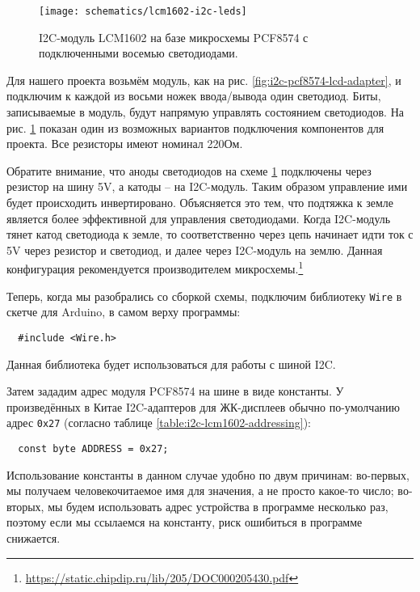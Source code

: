 \documentclass[../sparc.tex]{subfiles}
\begin{document}
\begin{figure}[H]
  \centering
  \texttt{[image: schematics/lcm1602-i2c-leds]}
  \caption{I2C-модуль LCM1602 на базе микросхемы PCF8574 с подключенными восемью
    светодиодами.}
  \label{fig:lcm1602-i2c-leds}
\end{figure}

Для нашего проекта возьмём модуль, как на рис.
\ref{fig:i2c-pcf8574-lcd-adapter}, и подключим к каждой из восьми ножек
ввода/вывода один светодиод.  Биты, записываемые в модуль, будут напрямую
управлять состоянием светодиодов.  На рис. \ref{fig:lcm1602-i2c-leds} показан
один из возможных вариантов подключения компонентов для проекта.  Все резисторы
имеют номинал 220Ом.

Обратите внимание, что аноды светодиодов на схеме \ref{fig:lcm1602-i2c-leds}
подключены через резистор на шину 5V, а катоды -- на I2C-модуль.  Таким образом
управление ими будет происходить инвертировано.  Объясняется это тем, что
подтяжка к земле является более эффективной для управления светодиодами.  Когда
I2C-модуль тянет катод светодиода к земле, то соответственно через цепь начинает
идти ток с 5V через резистор и светодиод, и далее через I2C-модуль на землю.
Данная конфигурация рекомендуется производителем
микросхемы.\footnote{\url{https://static.chipdip.ru/lib/205/DOC000205430.pdf}}

Теперь, когда мы разобрались со сборкой схемы, подключим библиотеку
\texttt{Wire} в скетче для Arduino, в самом верху программы:

\begin{verbatim}
  #include <Wire.h>
\end{verbatim}

Данная библиотека будет использоваться для работы с шиной I2C.

Затем зададим адрес модуля PCF8574 на шине в виде константы.  У произведённых в
Китае I2C-адаптеров для ЖК-дисплеев обычно по-умолчанию адрес \texttt{0x27}
(согласно таблице \ref{table:i2c-lcm1602-addressing}):

\begin{verbatim}
  const byte ADDRESS = 0x27;
\end{verbatim}

Использование константы в данном случае удобно по двум причинам: во-первых, мы
получаем человекочитаемое имя для значения, а не просто какое-то число;
во-вторых, мы будем использовать адрес устройства в программе несколько раз,
поэтому если мы ссылаемся на константу, риск ошибиться в программе снижается.
\end{document}
